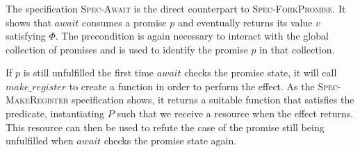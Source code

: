
\subsubsection{}
\label{sec:sched-spec-await}

The specification \textsc{Spec-Await} is the direct counterpart to \textsc{Spec-ForkPromise}.
It shows that \(await\) consumes a promise \(p\) and eventually returns its value \(v\) satisfying \(\Phi\).
The precondition \gsPInv{} is again necessary to interact with the global collection of promises and \gsIsPr{} is used to identify the promise \(p\) in that collection.

If \(p\) is still unfulfilled the first time \(await\) checks the promise state, it will call \(make\_register\) to create a  function in order to perform the \esuspend{} effect.
As the \textsc{Spec-MakeRegister} specification shows, it returns a suitable function that satisfies the \isreg{} predicate, instantiating \(P\) such that we receive a \gspdone{} resource when the effect returns.
This resource can then be used to refute the case of the promise still being unfulfilled when \(await\) checks the promise state again.


